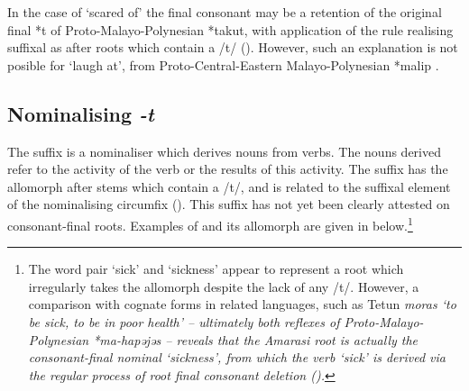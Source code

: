 In the case of  `scared of' the final consonant
may be a retention of the original final *t of Proto-Malayo-Polynesian *takut,
with application of the rule realising suffixal  as 
after roots which contain a /t/ ().
However, such an explanation is not posible for  `laugh at',
from Proto-Central-Eastern Malayo-Polynesian *malip \citep{bltr}.

\subsection{Nominalising \it{-t}}\label{sec:Nom-t}
The suffix  is a nominaliser which derives nouns from verbs.
The nouns derived refer to the activity of the verb or the results of this activity.
The suffix  has the allomorph  after stems which contain a /t/,
and is related to the suffixal element of
the nominalising circumfix  ().
This suffix has not yet been clearly attested on consonant-final roots.
Examples of  and its allomorph  are given in  below.\footnote{
		The word pair  `sick' and  `sickness' appear to represent
		a root which irregularly takes the allomorph  despite the lack of any /t/.
		However, a comparison with cognate forms in related languages,
		such as Tetun \it{moras} `to be sick, to be in poor health' \citep[143]{mo84}
		-- ultimately both reflexes of Proto-Malayo-Polynesian *ma-hapəjəs --
		reveals that the Amarasi root is actually the consonant-final nominal  `sickness',
		from which the verb  `sick' is derived via the regular process
		of root final consonant deletion ().}

